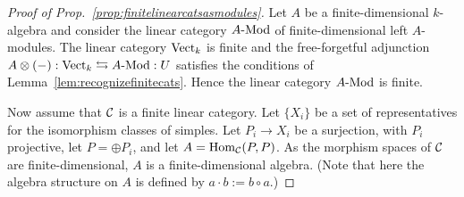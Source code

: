 \documentclass{amsart}
\begin{document}
\begin{proof}[Proof of Prop.~\ref{prop:finitelinearcatsasmodules}]
	   
	Let $A$ be a finite-dimensional $k$-algebra and consider the linear category $\Mod{A}{}$ of finite-dimensional left $A$-modules. The linear category $\mathrm{Vect}_k$ is finite and the  free-forgetful adjunction $A\otimes(-): \Vect_k \leftrightarrows \Mod{A}{}: U$ satisfies the conditions of Lemma~\ref{lem:recognizefinitecats}. Hence the linear category $\Mod{A}{}$ is finite.
	
	
	
	
	Now assume that $\mathcal C$ is a finite linear category. Let $\{X_i\}$ be a set of representatives for the isomorphism classes of simples. Let $P_i \to X_i$ be a surjection, with $P_i$ projective, let $P = \oplus P_i$, and let $A = \operatorname{Hom}_{\mathcal C}(P,P)$. As the morphism spaces of $\mathcal C$ are finite-dimensional, $A$ is a finite-dimensional algebra.  (Note that here the algebra structure on $A$ is defined by $a \cdot b := b \circ a$.)
	

\end{proof}
\end{document}
